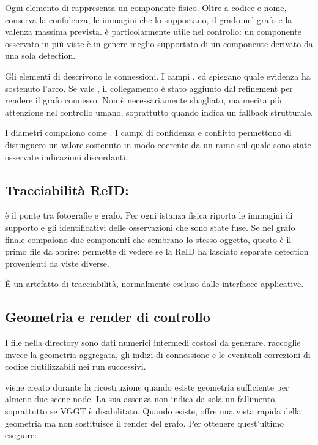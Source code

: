 Ogni elemento di  rappresenta un componente fisico. Oltre a codice
e nome, conserva la confidenza, le immagini che lo supportano, il grado nel
grafo e la valenza massima prevista.  è particolarmente
utile nel controllo: un componente osservato in più viste è in genere meglio
supportato di un componente derivato da una sola detection.

Gli elementi di  descrivono le connessioni. I campi
,  ed 
spiegano quale evidenza ha sostenuto l'arco. Se  vale
, il collegamento è stato aggiunto dal refinement per rendere il
grafo connesso. Non è necessariamente sbagliato, ma merita più attenzione nel
controllo umano, soprattutto quando  indica un fallback
strutturale.

I diametri compaiono come . I campi di confidenza e conflitto
permettono di distinguere un valore sostenuto in modo coerente da un ramo sul
quale sono state osservate indicazioni discordanti.

\subsection{Tracciabilità ReID: }

 è il ponte tra fotografie e grafo. Per ogni istanza
fisica riporta le immagini di supporto e gli identificativi delle osservazioni
che sono state fuse. Se nel grafo finale compaiono due componenti che sembrano
lo stesso oggetto, questo è il primo file da aprire: permette di vedere se la
ReID ha lasciato separate detection provenienti da viste diverse.

È un artefatto di tracciabilità, normalmente escluso dalle interfacce
applicative.

\subsection{Geometria e render di controllo}

I file nella directory  sono dati numerici intermedi costosi da
generare.  raccoglie invece la geometria aggregata,
gli indizi di connessione e le eventuali correzioni di codice riutilizzabili nei
run successivi.

 viene creato durante la ricostruzione quando esiste
geometria sufficiente per almeno due scene node. La sua assenza non indica da
sola un fallimento, soprattutto se VGGT è disabilitato. Quando esiste, offre una
vista rapida della geometria ma non sostituisce il render del grafo. Per
ottenere quest'ultimo eseguire:


